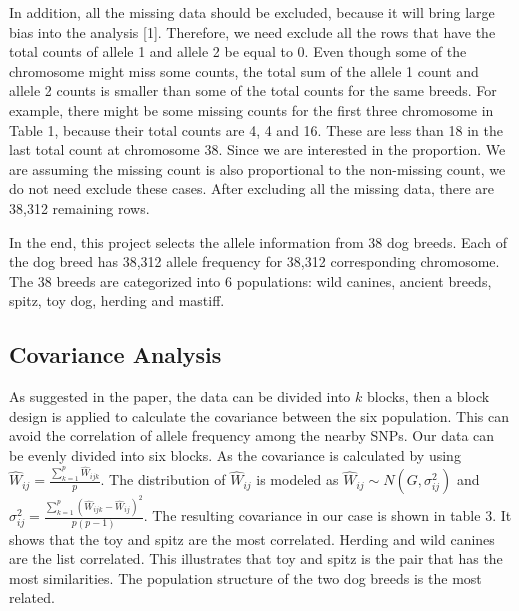 \documentclass{article} %
\begin{document}
In addition, all the missing data should be excluded, because it will bring large bias into the analysis [1]. Therefore, we need exclude all the rows that have the total counts of allele 1 and allele 2 be equal to 0. Even though some of the chromosome might miss some counts, the total sum of the allele 1 count and allele 2 counts is smaller than some of the total counts for the same breeds. For example, there might be some missing counts for the first three chromosome in Table 1, because their total counts are 4, 4 and 16. These are less than 18 in the last total count at chromosome 38. Since we are interested in the proportion. We are assuming the missing count is also proportional to the non-missing count, we do not need exclude these cases. After excluding all the missing data, there are 38,312 remaining rows.

In the end, this project selects the allele information from 38 dog breeds. Each of the dog breed has 38,312 allele frequency for 38,312 corresponding chromosome. The 38 breeds are categorized into 6 populations: wild canines, ancient breeds, spitz, toy dog, herding and mastiff.

\subsection{Covariance Analysis}

As suggested in the paper, the data can be divided into $k$ blocks, then a block design is applied to calculate the covariance between the six population. This can avoid the correlation of allele frequency among the nearby SNPs. Our data can be evenly divided into six blocks. As the covariance is calculated by using $\hat{W}_{ij} = \frac{\sum_{k=1}^p \hat{W}_{ijk}}{p}$. The distribution of $\hat{W}_{ij}$ is modeled as $\hat{W}_{ij} \sim N(G, \sigma_{ij}^2)$ and $\sigma_{ij}^2=\frac{\sum_{k=1}^p(\hat{W}_{ijk}-\hat{W}_{ij})^2}{p(p-1)}$. The resulting covariance in our case is shown in table 3. It shows that the toy and spitz are the most correlated. Herding and wild canines are the list correlated. This illustrates that toy and spitz is the pair that has the most similarities. The population structure of the two dog breeds is the most related. 
\end{document}
